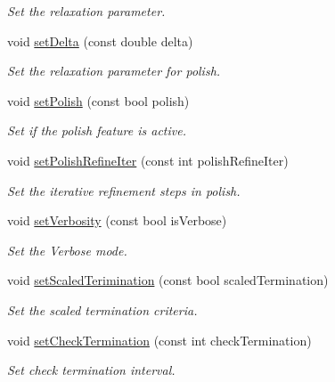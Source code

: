 \begin{DoxyCompactItemize}
\begin{DoxyCompactList}\small\item\em Set the relaxation parameter. \end{DoxyCompactList}\item 
void \hyperlink{classOSQPWrapper_1_1OptimizerSettings_addda3f07a042e3f472195d5f7198cf9c}{set\+Delta} (const double delta)
\begin{DoxyCompactList}\small\item\em Set the relaxation parameter for polish. \end{DoxyCompactList}\item 
void \hyperlink{classOSQPWrapper_1_1OptimizerSettings_a779bf46ff9b22070b12e4a1f07fee6c8}{set\+Polish} (const bool polish)
\begin{DoxyCompactList}\small\item\em Set if the polish feature is active. \end{DoxyCompactList}\item 
void \hyperlink{classOSQPWrapper_1_1OptimizerSettings_a563ceb07445f6708a9ae2c2db20c41c4}{set\+Polish\+Refine\+Iter} (const int polish\+Refine\+Iter)
\begin{DoxyCompactList}\small\item\em Set the iterative refinement steps in polish. \end{DoxyCompactList}\item 
void \hyperlink{classOSQPWrapper_1_1OptimizerSettings_ad063e2a491c3506ea3023a3734ad2d45}{set\+Verbosity} (const bool is\+Verbose)
\begin{DoxyCompactList}\small\item\em Set the Verbose mode. \end{DoxyCompactList}\item 
void \hyperlink{classOSQPWrapper_1_1OptimizerSettings_ab34796bbbdbd5a6ecb29517389156914}{set\+Scaled\+Terimination} (const bool scaled\+Termination)
\begin{DoxyCompactList}\small\item\em Set the scaled termination criteria. \end{DoxyCompactList}\item 
void \hyperlink{classOSQPWrapper_1_1OptimizerSettings_ae227a4107d7475116ce236fa08b99aca}{set\+Check\+Termination} (const int check\+Termination)
\begin{DoxyCompactList}\small\item\em Set check termination interval. \end{DoxyCompactList}\item 

\end{DoxyCompactItemize}
